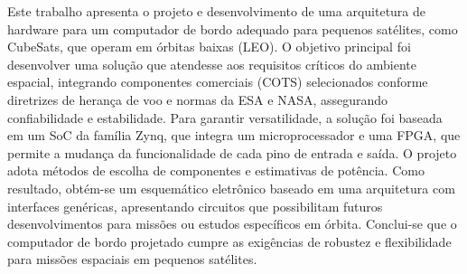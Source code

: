 \documentclass[
12pt,				%
oneside,			%
a4paper,			%
chapter=TITLE,		%
section=TITLE,		%
english,			%
brazil				%
hyperref=hidelinks]{abntex2}
\begin{document}
\imprimircapa

\imprimirfolhaderosto

\begin{folhadeaprovacao}
\end{folhadeaprovacao}




\begin{resumo}
Este trabalho apresenta o projeto e desenvolvimento de uma arquitetura de hardware para um computador de bordo adequado para pequenos satélites, como CubeSats, que operam em órbitas baixas (LEO). O objetivo principal foi desenvolver uma solução que atendesse aos requisitos críticos do ambiente espacial, integrando componentes comerciais (COTS) selecionados conforme diretrizes de herança de voo e normas da ESA e NASA, assegurando confiabilidade e estabilidade. Para garantir versatilidade, a solução foi baseada em um SoC da família Zynq, que integra um microprocessador e uma FPGA, que permite a mudança da funcionalidade de cada pino de entrada e saída. O projeto adota métodos de escolha de componentes e estimativas de potência. Como resultado, obtém-se um esquemático eletrônico baseado em uma arquitetura com interfaces genéricas, apresentando circuitos que possibilitam futuros desenvolvimentos para missões ou estudos específicos em órbita. Conclui-se que o computador de bordo projetado cumpre as exigências de robustez e flexibilidade para missões espaciais em pequenos satélites.

\end{resumo}
\end{document}
